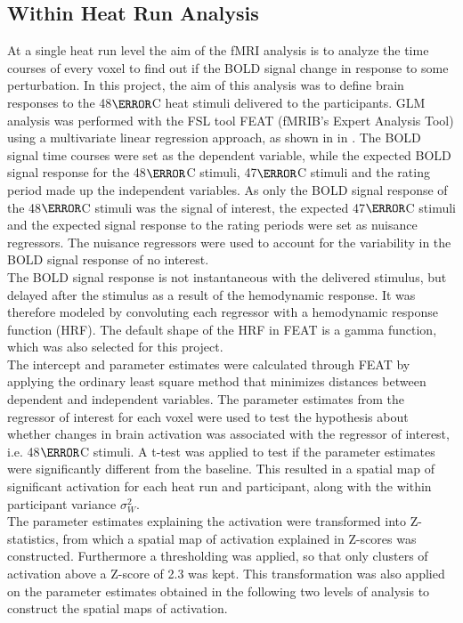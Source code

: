 \subsection{Within Heat Run Analysis}
At a single heat run level the aim of the fMRI analysis is to analyze the time courses of every voxel to find out if the BOLD signal change in response to some perturbation. In this project, the aim of this analysis was to define brain responses to the 48$\degree$C heat stimuli delivered to the participants. GLM analysis was performed with the FSL tool FEAT (fMRIB’s Expert Analysis Tool) using a multivariate linear regression approach, as shown in  in . The BOLD signal time courses were set as the dependent variable, while the expected BOLD signal response for the 48$\degree$C stimuli, 47$\degree$C stimuli and the rating period made up the independent variables. As only the BOLD signal response of the 48$\degree$C stimuli was the signal of interest, the expected 47$\degree$C stimuli and the expected signal response to the rating periods were set as nuisance regressors. The nuisance regressors were used to account for the variability in the BOLD signal response of no interest. \\
The BOLD signal response is not instantaneous with the delivered stimulus, but delayed after the stimulus as a result of the hemodynamic response. It was therefore modeled by convoluting each regressor with a hemodynamic response function (HRF). The default shape of the HRF in FEAT is a  gamma function, which was also selected for this project. \\
The intercept and parameter estimates were calculated through FEAT by applying the ordinary least square method that minimizes distances between dependent and independent variables. The parameter estimates from the regressor of interest for each voxel were used to test the hypothesis about whether changes in brain activation was associated with the regressor of interest, i.e. 48$\degree$C stimuli. A t-test was applied to test if the parameter estimates were significantly different from the baseline. This resulted in a spatial map of significant activation for each heat run and participant, along with the within participant variance $\sigma_{W}^{2}$. \\
The parameter estimates explaining the activation were transformed into Z-statistics, from which a spatial map of activation explained in Z-scores was constructed. Furthermore a thresholding was applied, so that only clusters of activation above a Z-score of 2.3 was kept. This transformation was also applied on the parameter estimates obtained in the following two levels of analysis to construct the spatial maps of activation. 

